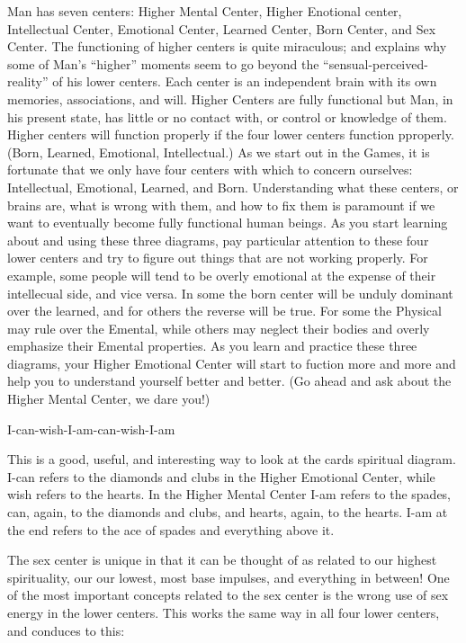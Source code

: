 \documentclass[12pt,letterpaper]{book}
\begin{document}
Man has seven centers: Higher Mental Center, Higher Enotional center, Intellectual Center, Emotional Center, Learned Center, Born Center, and Sex Center. The functioning of higher centers is quite miraculous; and explains why some of Man's ``higher'' moments seem to go beyond the ``sensual-perceived-reality'' of his lower centers. Each center is an independent brain with its own memories, associations, and will. Higher Centers are fully functional but Man, in his present state, has little or no contact with, or control or knowledge of them. Higher centers will function properly if the four lower centers function pproperly. (Born, Learned, Emotional, Intellectual.) As we start out in the Games, it is fortunate that we only have four centers with which to concern ourselves: Intellectual, Emotional, Learned, and Born. Understanding what these centers, or brains are, what is wrong with them, and how to fix them is paramount if we want to eventually become fully functional human beings. As you start learning about and using these three diagrams, pay particular attention to these four lower centers and try to figure out things that are not working properly. For example, some people will tend to be overly emotional at the expense of their intellecual side, and vice versa. In some the born center will be unduly dominant over the learned, and for others the reverse will be true. For some the Physical may rule over the Emental, while others may neglect their bodies and overly emphasize their Emental properties. As you learn and practice these three diagrams, your Higher Emotional Center will start to fuction more and more and help you to understand yourself better and better. (Go ahead and ask about the Higher Mental Center, we dare you!)

I-can-wish-I-am-can-wish-I-am

This is a good, useful, and interesting way to look at the cards spiritual diagram. I-can refers to the diamonds and clubs in the Higher Emotional Center, while wish refers to the hearts. In the Higher Mental Center I-am refers to the spades, can, again, to the diamonds and clubs, and hearts, again, to the hearts. I-am at the end refers to the ace of spades and everything above it.

The sex center is unique in that it can be thought of as related to our highest spirituality, our our lowest, most base impulses, and everything in between! One of the most important concepts related to the sex center is the wrong use of sex energy in the lower centers. This works the same way in all four lower centers, and conduces to this:
\end{document}

